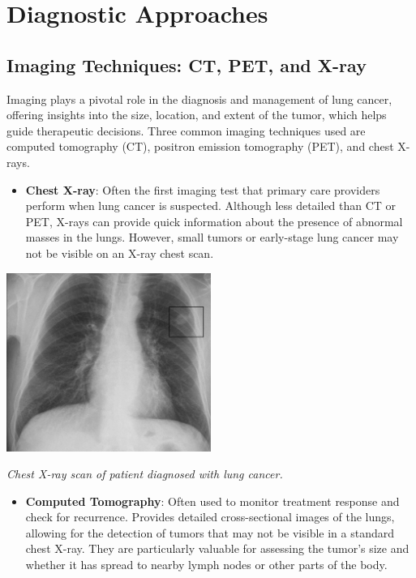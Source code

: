 \section{Diagnostic Approaches}

\subsection{Imaging Techniques: CT, PET, and X-ray}
Imaging plays a pivotal role in the diagnosis and management of lung cancer, offering insights into 
the size, location, and extent of the tumor, which helps guide therapeutic decisions. Three common 
imaging techniques used are computed tomography (CT), positron emission tomography (PET), and chest 
X-rays.

\begin{itemize}
    \item \textbf{Chest X-ray}: Often the first imaging test that primary care providers perform 
    when lung cancer is suspected. Although less detailed than CT or PET, X-rays can provide quick 
    information about the presence of abnormal masses in the lungs. However, small tumors or 
    early-stage lung cancer may not be visible on an X-ray chest scan. \cite{lung_cancer_diagnosis}
\end{itemize}

\vspace{1em}
\begin{center}
    \includegraphics[width=0.5\textwidth]{../assets/04-diagnosis/lc-x-ray.png}

    \small\textit{Chest X-ray scan of patient diagnosed with lung cancer. \cite{inbook}}
\end{center}
\vspace{1em}

\begin{itemize}
    \item \textbf{Computed Tomography}: Often used to monitor treatment response and check for 
    recurrence. Provides detailed cross-sectional images of the lungs, allowing for the detection of 
    tumors that may not be visible in a standard chest X-ray. They are particularly valuable for 
    assessing the tumor’s size and whether it has spread to nearby lymph nodes or other parts of the 
    body.
\end{itemize}


